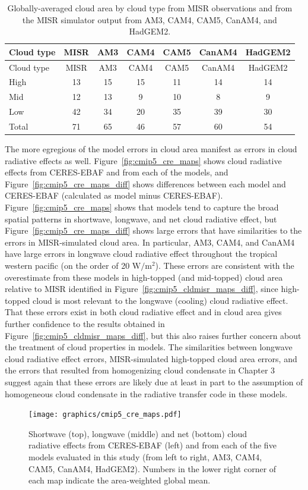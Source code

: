 \begin{longtable}[]{@{}lcccccc@{}}
\caption{\label{tbl:cmip5_cldmisr}Globally-averaged cloud area by cloud
type from MISR observations and from the MISR simulator output from AM3,
CAM4, CAM5, CanAM4, and HadGEM2. }\tabularnewline
\toprule
Cloud type & MISR & AM3 & CAM4 & CAM5 & CanAM4 & HadGEM2\tabularnewline
\midrule
\endfirsthead
\toprule
Cloud type & MISR & AM3 & CAM4 & CAM5 & CanAM4 & HadGEM2\tabularnewline
\midrule
\endhead
High & 13 & 15 & 15 & 11 & 14 & 14\tabularnewline
Mid & 12 & 13 & 9 & 10 & 8 & 9\tabularnewline
Low & 42 & 34 & 20 & 35 & 39 & 30\tabularnewline
Total & 71 & 65 & 46 & 57 & 60 & 54\tabularnewline
\bottomrule
\end{longtable}

The more egregious of the model errors in cloud area manifest as errors
in cloud radiative effects as well. Figure~\ref{fig:cmip5_cre_maps}
shows cloud radiative effects from CERES-EBAF and from each of the
models, and Figure~\ref{fig:cmip5_cre_maps_diff} shows differences
between each model and CERES-EBAF (calculated as model minus
CERES-EBAF). Figure~\ref{fig:cmip5_cre_maps} shows that models tend to
capture the broad spatial patterns in shortwave, longwave, and net cloud
radiative effect, but Figure~\ref{fig:cmip5_cre_maps_diff} shows large
errors that have similarities to the errors in MISR-simulated cloud
area. In particular, AM3, CAM4, and CanAM4 have large errors in longwave
cloud radiative effect throughout the tropical western pacific (on the
order of 20 \(\textrm{W}/\textrm{m}^2\)). These errors are consistent
with the overestimate from these models in high-topped (and mid-topped)
cloud area relative to MISR identified in
Figure~\ref{fig:cmip5_cldmisr_maps_diff}, since high-topped cloud is
most relevant to the longwave (cooling) cloud radiative effect. That
these errors exist in both cloud radiative effect and in cloud area
gives further confidence to the results obtained in
Figure~\ref{fig:cmip5_cldmisr_maps_diff}, but this also raises further
concern about the treatment of cloud properties in models. The
similarities between longwave cloud radiative effect errors,
MISR-simulated high-topped cloud area errors, and the errors that
resulted from homogenizing cloud condensate in Chapter 3 suggest again
that these errors are likely due at least in part to the assumption of
homogeneous cloud condensate in the radiative transfer code in these
models.

\begin{figure}[htbp]
\centering
\texttt{[image: graphics/cmip5\_cre\_maps.pdf]}
\caption{\label{fig:cmip5_cre_maps}Shortwave (top), longwave (middle)
and net (bottom) cloud radiative effects from CERES-EBAF (left) and from
each of the five models evaluated in this study (from left to right,
AM3, CAM4, CAM5, CanAM4, HadGEM2). Numbers in the lower right corner of
each map indicate the area-weighted global
mean.}\label{fig:cmip5ux5fcreux5fmaps}
\end{figure}

